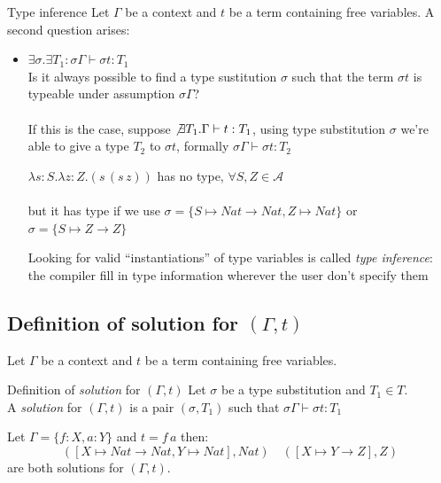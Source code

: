 \documentclass[8pt]{beamer}
\begin{document}
\begin{frame}{Type inference}
    Let $\Gamma$ be a context and $t$ be a term containing free variables.
    A second question arises:
    \begin{itemize}
        \item $\exists \sigma. \exists T_1: 
            \sigma \Gamma \vdash \sigma t : T_1$\\
            {\footnotesize Is it always possible to find a type 
                sustitution $\sigma$ such that the term 
                $\sigma t$ is typeable under assumption $\sigma \Gamma$?}\\~\\
            If this is the case, suppose $\not \exists T_{1}.
            \Gamma \vdash t:T_1$, using 
            type substitution $\sigma$ we're able to give a type $T_{2}$ 
            to $\sigma t$, formally $\sigma \Gamma \vdash \sigma t: T_{2}$
            \pause
            \begin{example}
                $\lambda s:S.\lambda z:Z.(s\, (s\, z))$ 
                has {\color{red} no} type, $\forall S,Z \in \mathcal{A}$\\~\\
                but it has type if we use $\sigma = \{
                    S \mapsto Nat \rightarrow Nat, Z \mapsto Nat\}$ or
                    $\sigma = \{S \mapsto Z \rightarrow Z\}$
            \end{example}
            \pause
            Looking for valid ``instantiations'' of type variables is called
            \emph{type inference}: the compiler fill in type information 
            wherever the user don't specify them
    \end{itemize}
\end{frame}

\subsection{Definition of solution for $(\Gamma, t)$}

\begin{frame}
    Let $\Gamma$ be a context and $t$ be a term containing free variables.
    \begin{block}{Definition of \emph{solution} for $(\Gamma, t)$}
        Let $\sigma$ be a type substitution and $T_{1} \in T$.\\
        A  \emph{solution} for $(\Gamma, t)$ is a pair $(\sigma, T_{1})$
        such that $\sigma \Gamma \vdash \sigma t:T_{1}$
    \end{block}
    \pause
    \begin{example}
        Let $\Gamma = \{f:X, a:Y\}$ and $t = f\, a$ then:
        \begin{displaymath}
            ([X \mapsto Nat \rightarrow Nat, Y \mapsto Nat], Nat) \quad 
            ([X \mapsto Y \rightarrow Z], Z)
        \end{displaymath}
        are both solutions for $(\Gamma, t)$.
    \end{example}
\end{frame}
\end{document}
